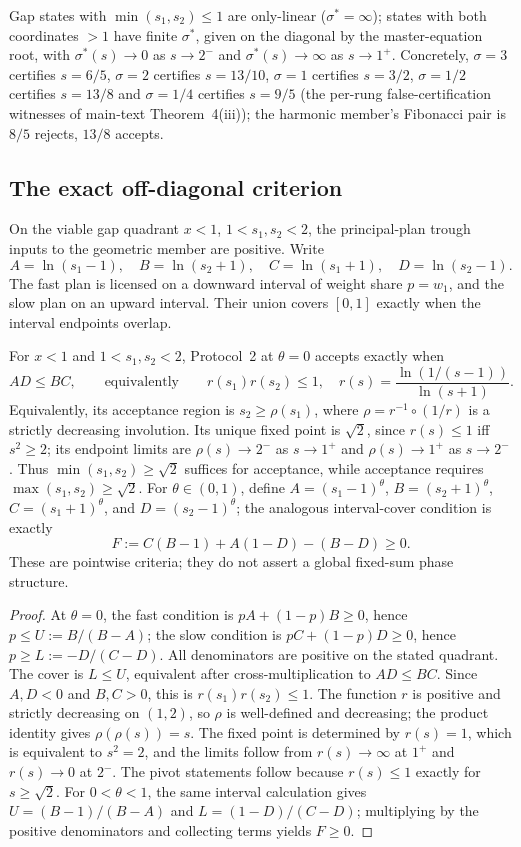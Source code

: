 Gap states with $\min(s_1,s_2)\le1$ are only-linear ($\sigma^*=\infty$); states with both coordinates $>1$ have finite $\sigma^*$, given on the diagonal by the master-equation root, with $\sigma^*(s)\to0$ as $s\to2^-$ and $\sigma^*(s)\to\infty$ as $s\to1^+$. Concretely, $\sigma=3$ certifies $s=6/5$, $\sigma=2$ certifies $s=13/10$, $\sigma=1$ certifies $s=3/2$, $\sigma=1/2$ certifies $s=13/8$ and $\sigma=1/4$ certifies $s=9/5$ (the per-rung false-certification witnesses of main-text Theorem~4(iii)); the harmonic member's Fibonacci pair is $8/5$ rejects, $13/8$ accepts.

\subsection{The exact off-diagonal criterion}

On the viable gap quadrant $x<1$, $1<s_1,s_2<2$, the principal-plan trough inputs to the geometric member are positive. Write
\[
A=\ln(s_1-1),\quad B=\ln(s_2+1),\quad C=\ln(s_1+1),\quad D=\ln(s_2-1).
\]
The fast plan is licensed on a downward interval of weight share $p=w_1$, and the slow plan on an upward interval. Their union covers $[0,1]$ exactly when the interval endpoints overlap.

\begin{theorem}\label{thm:offdiag}
For $x<1$ and $1<s_1,s_2<2$, Protocol~2 at $\theta=0$ accepts exactly when
\[
AD\le BC,\qquad\text{equivalently}\qquad r(s_1)r(s_2)\le1,
\quad r(s)=\frac{\ln(1/(s-1))}{\ln(s+1)}.
\]
Equivalently, its acceptance region is $s_2\ge\rho(s_1)$, where $\rho=r^{-1}\circ(1/r)$ is a strictly decreasing involution. Its unique fixed point is $\sqrt2$, since $r(s)\le1$ iff $s^2\ge2$; its endpoint limits are $\rho(s)\to2^-$ as $s\to1^+$ and $\rho(s)\to1^+$ as $s\to2^-$. Thus $\min(s_1,s_2)\ge\sqrt2$ suffices for acceptance, while acceptance requires $\max(s_1,s_2)\ge\sqrt2$. For $\theta\in(0,1)$, define $A=(s_1-1)^\theta$, $B=(s_2+1)^\theta$, $C=(s_1+1)^\theta$, and $D=(s_2-1)^\theta$; the analogous interval-cover condition is exactly
\[
F:=C(B-1)+A(1-D)-(B-D)\ge0.
\]
These are pointwise criteria; they do not assert a global fixed-sum phase structure.
\end{theorem}

\begin{proof}
At $\theta=0$, the fast condition is $pA+(1-p)B\ge0$, hence $p\le U:=B/(B-A)$; the slow condition is $pC+(1-p)D\ge0$, hence $p\ge L:=-D/(C-D)$. All denominators are positive on the stated quadrant. The cover is $L\le U$, equivalent after cross-multiplication to $AD\le BC$. Since $A,D<0$ and $B,C>0$, this is $r(s_1)r(s_2)\le1$. The function $r$ is positive and strictly decreasing on $(1,2)$, so $\rho$ is well-defined and decreasing; the product identity gives $\rho(\rho(s))=s$. The fixed point is determined by $r(s)=1$, which is equivalent to $s^2=2$, and the limits follow from $r(s)\to\infty$ at $1^+$ and $r(s)\to0$ at $2^-$. The pivot statements follow because $r(s)\le1$ exactly for $s\ge\sqrt2$. For $0<\theta<1$, the same interval calculation gives $U=(B-1)/(B-A)$ and $L=(1-D)/(C-D)$; multiplying by the positive denominators and collecting terms yields $F\ge0$.
\end{proof}

